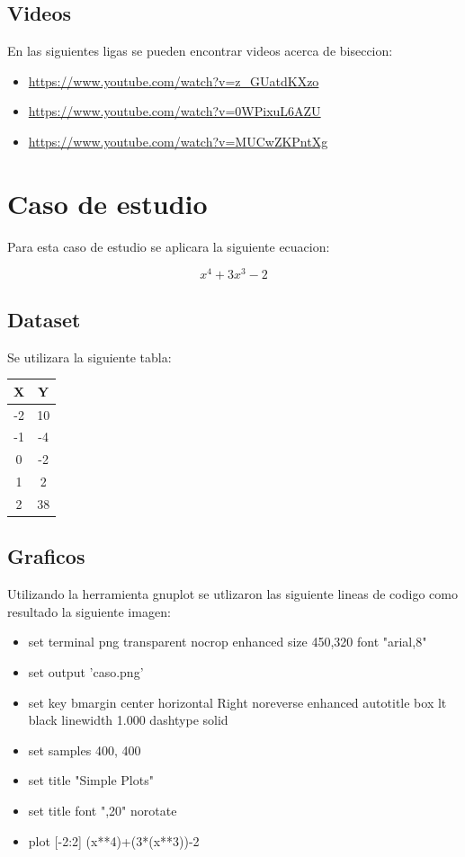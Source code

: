 \documentclass[11pt]{article}
\begin{document}
\subsection{Videos}

En las siguientes ligas se pueden encontrar videos acerca de biseccion:
\begin{itemize}
\item \url{https://www.youtube.com/watch?v=z_GUatdKXzo}
\item \url{https://www.youtube.com/watch?v=0WPixuL6AZU}
\item \url{https://www.youtube.com/watch?v=MUCwZKPntXg}
\end{itemize}

\clearpage
\section{Caso de estudio}
Para esta caso de estudio se aplicara la siguiente ecuacion:

\begin{equation*}
  x^4+3x^3-2
\end{equation*}

\subsection{Dataset}

Se utilizara la siguiente tabla:

\begin{center}
\begin{tabular}{ |c|c| } 
\hline
X & Y \\
\hline
-2 & 10  \\ 
-1 & -4  \\ 
0 & -2  \\ 
1 & 2 \\ 
2 & 38  \\ 
\hline
\end{tabular}
\end{center}

\subsection{Graficos}

Utilizando la herramienta gnuplot se utlizaron las siguiente lineas de codigo como resultado la siguiente imagen:

\begin{itemize}
  \item set terminal png transparent nocrop enhanced size 450,320 font "arial,8" 
  \item set output 'caso.png'
  \item set key bmargin center horizontal Right noreverse enhanced autotitle box lt black linewidth 1.000 dashtype solid
  \item set samples 400, 400
  \item set title "Simple Plots"
  \item set title  font ",20" norotate
  \item plot [-2:2] (x**4)+(3*(x**3))-2
\end{itemize}
\end{document}
